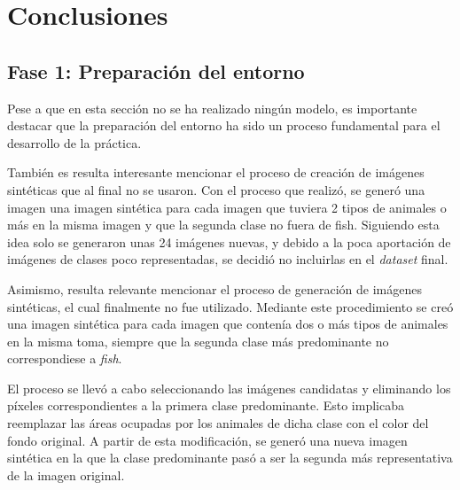 \section{Conclusiones}

\noindent


\subsection{Fase 1: Preparación del entorno}

\quad

\noindent
Pese a que en esta sección no se ha realizado ningún modelo, 
es importante destacar que la preparación del entorno ha sido un 
proceso fundamental para el desarrollo de la práctica.

\quad

\noindent
También es resulta interesante mencionar el proceso de creación de imágenes sintéticas que al final no se 
usaron. Con el proceso que realizó, se generó una imagen una imagen sintética para cada
imagen que tuviera 2 tipos de animales o más en la misma imagen y que la segunda clase no fuera de fish.
Siguiendo esta idea solo se generaron unas 24 imágenes nuevas, y debido a la poca aportación de imágenes de clases poco 
representadas, se decidió no incluirlas en el \textit{dataset} final. 

\quad

\noindent
Asimismo, resulta relevante mencionar el proceso de generación de imágenes sintéticas, 
el cual finalmente no fue utilizado. Mediante este procedimiento se creó una imagen 
sintética para cada imagen que contenía dos o más tipos de animales en la misma toma, 
siempre que la segunda clase más predominante no correspondiese a \textit{fish}. 

\quad

\noindent
El proceso se llevó a cabo seleccionando las imágenes candidatas y eliminando los 
píxeles correspondientes a la primera clase predominante. Esto implicaba reemplazar 
las áreas ocupadas por los animales de dicha clase con el color del fondo original. 
A partir de esta modificación, se generó una nueva imagen sintética en la que la clase 
predominante pasó a ser la segunda más representativa de la imagen original.

\quad

